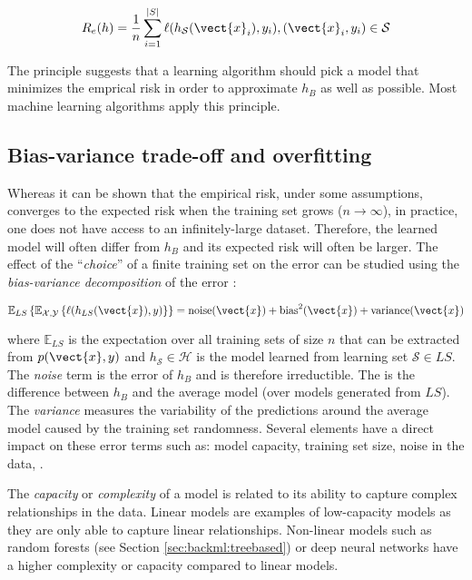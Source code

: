\begin{equation}
\label{eqn:backml:empiricalrisk}
R_e(h) = \frac{1}{n} \sum_{i=1}^{|S|} \ell(h_\mathcal{S}(\vect{x}_i), y_i), (\vect{x}_i, y_i) \in \mathcal{S}
\end{equation}

The  principle suggests that a learning algorithm should pick a model that minimizes the emprical risk in order to approximate $h_B$ as well as possible. Most machine learning algorithms apply this principle.

\subsection{Bias-variance trade-off and overfitting}
\label{ssec:backml:bvtradeoff}

Whereas it can be shown that the empirical risk, under some assumptions, converges to the expected risk when the training set grows ($n \rightarrow \infty$), in practice, one does not have access to an infinitely-large dataset. Therefore, the learned model will often differ from $h_B$ and its expected risk will often be larger. The effect of the ``\textit{choice}'' of a finite training set on the error can be studied using the \textit{bias-variance decomposition} of the error \parencite{geman1992neural, geurts2009bias, friedman2017elements}:

\begin{equation}
\label{eqn:backml:biasvariancedec}
\mathbb{E}_{LS}\left\{\mathbb{E}_{\mathcal{X},\mathcal{Y}}\left\{ \ell(h_{LS}(\vect{x}), y)\right\}\right\} = \text{noise}(\vect{x}) + \text{bias}^2(\vect{x}) + \text{variance}(\vect{x})
\end{equation}

where $\mathbb{E}_{LS}$ is the expectation over all training sets of size $n$ that can be extracted from $p(\vect{x},y)$ and $h_{\mathcal{S}} \in \mathcal{H}$ is the model learned from learning set $\mathcal{S} \in LS$. The \textit{noise} term is the error of $h_B$ and is therefore irreductible. The  is the difference between $h_B$ and the average model (over models generated from $LS$). The \textit{variance} measures the variability of the predictions around the average model caused by the training set randomness. Several elements have a direct impact on these error terms such as: model capacity, training set size, noise in the data, \etc. 

The \textit{capacity} or \textit{complexity} of a model is related to its ability to capture complex relationships in the data. Linear models are examples of low-capacity models as they are only able to capture linear relationships. Non-linear models such as random forests (see Section \ref{sec:backml:treebased}) or deep neural networks have a higher complexity or capacity compared to linear models. 

